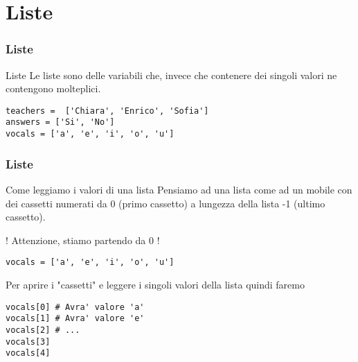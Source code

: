 \section{Liste}

\begin{frame}[fragile]
\frametitle{Liste}
    \begin{block}{Liste}
Le liste sono delle variabili che, invece che contenere dei singoli valori ne contengono molteplici.
    \end{block}
    
    \begin{lstlisting}
teachers =  ['Chiara', 'Enrico', 'Sofia']
answers = ['Si', 'No']
vocals = ['a', 'e', 'i', 'o', 'u']
    \end{lstlisting}
\end{frame}

\begin{frame}[fragile]
\frametitle{Liste}
    \begin{block}{Come leggiamo i valori di una lista}
Pensiamo ad una lista come ad un mobile con dei cassetti numerati da 0 (primo cassetto) a lungezza della lista -1 (ultimo cassetto).

! Attenzione, stiamo partendo da 0 !
    \end{block}
    
    \begin{lstlisting}
vocals = ['a', 'e', 'i', 'o', 'u']
    \end{lstlisting}
    
        \begin{block}{}
Per aprire i "cassetti" e leggere i singoli valori della lista quindi faremo
    \end{block}

    \begin{lstlisting}
vocals[0] # Avra' valore 'a'
vocals[1] # Avra' valore 'e'
vocals[2] # ...
vocals[3]
vocals[4]
    \end{lstlisting}

\end{frame}

